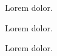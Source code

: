 \documentclass{article}
\begin{document}

Lorem  dolor.

Lorem  dolor.

Lorem  dolor.
\end{document}
